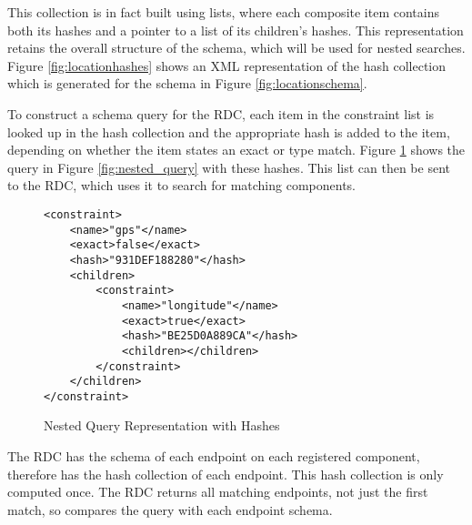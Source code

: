 \documentclass[12pt,twoside,notitlepage]{report}
\begin{document}
This collection is in fact built using lists, where each composite item contains both its hashes and a pointer to a list of its children's hashes.
This representation retains the overall structure of the schema, which will be used for nested searches. 
Figure \ref{fig:locationhashes} shows an XML representation of the hash collection which is generated for the schema in Figure \ref{fig:locationschema}.


To construct a schema query for the RDC, each item in the constraint list is looked up in the hash collection and the appropriate hash is added to the item, depending on whether the item states an exact or type match. 
Figure \ref{fig:nested_query_hash} shows the query in Figure \ref{fig:nested_query} with these hashes. 
This list can then be sent to the RDC, which uses it to search for matching components. 

\begin{figure}
\begin{lstlisting}[style=xml]
<constraint>
	<name>"gps"</name>
	<exact>false</exact>
	<hash>"931DEF188280"</hash>
	<children>
		<constraint>
			<name>"longitude"</name>
			<exact>true</exact>
			<hash>"BE25D0A889CA"</hash>
			<children></children>
		</constraint>
	</children>
</constraint>
\end{lstlisting}
\caption{Nested Query Representation with Hashes}
\label{fig:nested_query_hash}
\end{figure}

The RDC has the schema of each endpoint on each registered component, therefore has the hash collection of each endpoint. 
This hash collection is only computed once. 
The RDC returns all matching endpoints, not just the first match, so compares the query with each endpoint schema. 
\end{document}
